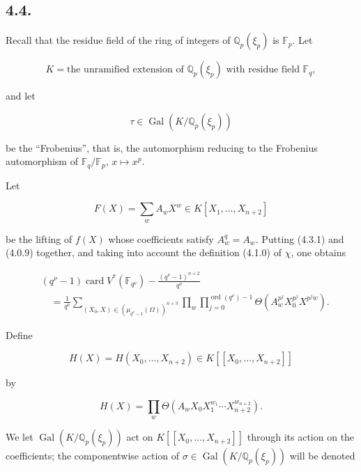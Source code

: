 \subsection*{4.4.}
Recall that the residue field of the ring of integers of
$\mathbb Q_p(\xi_p)$ is $\mathbb F_p$. Let

\begin{equation}\tag{4.4.0}
K=\text{the unramified extension of $\mathbb Q_p(\xi_p)$ with residue
field $\mathbb F_q$},
\end{equation}

and let

\begin{equation}\tag{4.4.1}
\tau\in\operatorname{Gal}(K/\mathbb Q_p(\xi_p))
\end{equation}

be the ``Frobenius'', that is, the automorphism reducing to the Frobenius
automorphism of $\mathbb F_q/\mathbb F_p$, $x\longmapsto x^p$.

Let

\begin{equation}\tag{4.4.2}
F(X)=\sum_w A_wX^w\in K[X_1,\ldots,X_{n+2}]
\end{equation}

be the lifting of $f(X)$ whose coefficients satisfy $A_w^q=A_w$.
Putting (4.3.1) and (4.0.9) together, and taking into account the
definition (4.1.0) of $\chi$, one obtains

\begin{equation}\tag{4.4.3}
\begin{aligned}
&(q^\nu-1)\operatorname{card}V^*(\mathbb F_{q^\nu})
-\frac{(q^\nu-1)^{n+2}}{q^\nu}\\
&\quad=\frac1{q^\nu}
\sum_{(X_0,X)\in(\mu_{q^\nu-1}(\Omega))^{n+3}}
\prod_w\prod_{j=0}^{\operatorname{ord}(q^\nu)-1}
\Theta\!\left(A_w^{p^j}X_0^{p^j}X^{p^jw}\right).
\end{aligned}
\end{equation}

Define

\[
H(X)=H(X_0,\ldots,X_{n+2})\in K[[X_0,\ldots,X_{n+2}]]
\]

by

\begin{equation}\tag{4.4.4}
H(X)=\prod_w
\Theta\!\left(A_wX_0X_1^{w_1}\cdots X_{n+2}^{w_{n+2}}\right).
\end{equation}

We let $\operatorname{Gal}(K/\mathbb Q_p(\xi_p))$ act on
$K[[X_0,\ldots,X_{n+2}]]$ through its action on the coefficients; the
componentwise action of
$\sigma\in\operatorname{Gal}(K/\mathbb Q_p(\xi_p))$ will be denoted

